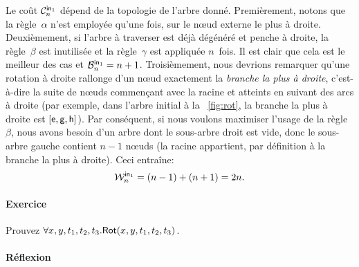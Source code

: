 Le coût \(\C{\fun{in}_1}{n}\) dépend de
la topologie de l'arbre donné. Premièrement, notons que la
règle~\(\alpha\) n'est employée qu'une fois, sur le nœud externe
le plus à droite. Deuxièmement, si l'arbre à traverser est déjà
dégénéré et penche à droite, la
règle~\(\beta\) est inutilisée et la règle~\(\gamma\) est appliquée
\(n\)~fois. Il est clair que cela est le meilleur des cas et
\(\B{\fun{in}_1}{n} = n + 1\).
Troisièmement, nous devrions remarquer qu'une rotation à droite
rallonge d'un nœud exactement la \emph{branche la plus à
  droite}, c'est-à-dire la suite de nœuds
commençant avec la racine et atteints en suivant des arcs à droite
(par exemple, dans l'arbre initial à la \fig~\vref{fig:rot}, la
branche la plus à droite est \([\fun{e}, \fun{g},
\fun{h}]\)). Par conséquent, si nous voulons maximiser l'usage de la
règle~\(\beta\), nous avons besoin d'un arbre dont le sous-arbre droit
est vide, donc le sous-arbre gauche contient \(n-1\) nœuds (la
racine appartient, par définition à la branche la plus à droite). Ceci
entraîne:
\begin{equation*}
  \W{\fun{in}_1}{n} = (n-1) + (n+1) = 2n.
  \index{in1@$\W{\fun{in}_1}{n}$}
  \index{arbre binaire!rotation|)}
\end{equation*}

\paragraph{Exercice}

Prouvez \(\forall x,y,t_1,t_2,t_3.\pred{Rot}{x,y,t_1,t_2,t_3}\).

\paragraph{Réflexion}

